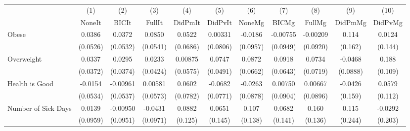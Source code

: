 {
\def\sym#1{\ifmmode^{#1}\else\(^{#1}\)\fi}
\begin{tabular}{l*{10}{c}}
\toprule
            &\multicolumn{1}{c}{(1)}&\multicolumn{1}{c}{(2)}&\multicolumn{1}{c}{(3)}&\multicolumn{1}{c}{(4)}&\multicolumn{1}{c}{(5)}&\multicolumn{1}{c}{(6)}&\multicolumn{1}{c}{(7)}&\multicolumn{1}{c}{(8)}&\multicolumn{1}{c}{(9)}&\multicolumn{1}{c}{(10)}\\
            &\multicolumn{1}{c}{NoneIt}&\multicolumn{1}{c}{BICIt}&\multicolumn{1}{c}{FullIt}&\multicolumn{1}{c}{DidPmIt}&\multicolumn{1}{c}{DidPvIt}&\multicolumn{1}{c}{NoneMg}&\multicolumn{1}{c}{BICMg}&\multicolumn{1}{c}{FullMg}&\multicolumn{1}{c}{DidPmMg}&\multicolumn{1}{c}{DidPvMg}\\
\midrule
Obese       &      0.0386         &      0.0372         &      0.0850         &      0.0522         &     0.00331         &     -0.0186         &    -0.00755         &    -0.00209         &       0.114         &      0.0124         \\
            &    (0.0526)         &    (0.0532)         &    (0.0541)         &    (0.0686)         &    (0.0806)         &    (0.0957)         &    (0.0949)         &    (0.0920)         &     (0.162)         &     (0.144)         \\
\addlinespace
Overweight  &      0.0337         &      0.0295         &      0.0233         &     0.00875         &      0.0747         &      0.0872         &      0.0918         &      0.0734         &     -0.0468         &       0.188         \\
            &    (0.0372)         &    (0.0374)         &    (0.0424)         &    (0.0575)         &    (0.0491)         &    (0.0662)         &    (0.0643)         &    (0.0719)         &    (0.0888)         &     (0.109)         \\
\addlinespace
Health is Good&     -0.0154         &    -0.00961         &     0.00581         &      0.0602         &     -0.0682         &     -0.0263         &     0.00750         &     0.00667         &     -0.0426         &      0.0579         \\
            &    (0.0534)         &    (0.0537)         &    (0.0573)         &    (0.0782)         &    (0.0771)         &    (0.0878)         &    (0.0904)         &    (0.0896)         &     (0.159)         &     (0.112)         \\
\addlinespace
Number of Sick Days&      0.0139         &    -0.00950         &     -0.0431         &      0.0882         &      0.0651         &       0.107         &      0.0682         &       0.160         &       0.115         &     -0.0292         \\
            &    (0.0959)         &    (0.0951)         &    (0.0971)         &     (0.125)         &     (0.145)         &     (0.138)         &     (0.141)         &     (0.136)         &     (0.244)         &     (0.203)         \\
\bottomrule
\end{tabular}
}
